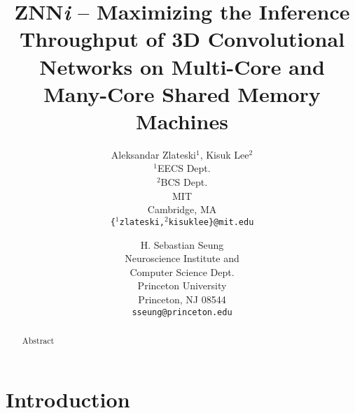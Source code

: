 \documentclass{article}
\begin{document}

\title{ZNN\emph{i} -- Maximizing the Inference Throughput of 3D
  Convolutional Networks on Multi-Core and Many-Core Shared Memory
  Machines}

\author{
Aleksandar Zlateski$^{1}$, Kisuk Lee$^{2}$\\
$^1$EECS Dept.\\
$^2$BCS Dept.\\
MIT\\ Cambridge, MA\\
{\tt\small \{$^1$zlateski,$^2$kisuklee\}@mit.edu}
\and
H. Sebastian Seung\\
Neuroscience Institute and\\
Computer Science Dept.\\
Princeton University\\ Princeton, NJ 08544\\
{\tt\small sseung@princeton.edu}
}



\maketitle



\begin{abstract}
Abstract
\end{abstract}


\section{Introduction}
\end{document}
